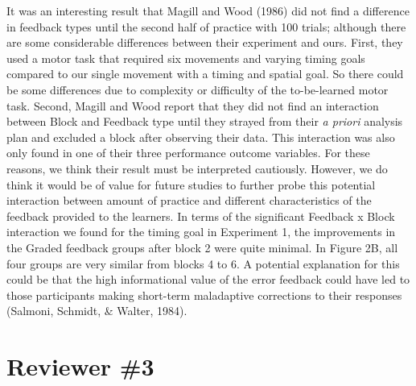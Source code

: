 \documentclass[final]{article}
\newcommand{\TaskEstimationBox}[2]{%
\ifoptiondraft{\parbox{1.0\linewidth}{\hfill \hfill {\colorbox{#2}{\color{White} \textbf{#1}}}}}%
{}%
}
\def\Done {\TaskEstimationBox{Done}{Blue}}
\begin{document}
It was an interesting result that Magill and Wood (1986) did not find a difference in feedback types until the second half of practice with 100 trials; although there are some considerable differences between their experiment and ours. First, they used a motor task that required six movements and varying timing goals compared to our single movement with a timing and spatial goal. So there could be some differences due to complexity or difficulty of the to-be-learned motor task. Second, Magill and Wood report that they did not find an interaction between Block and Feedback type until they strayed from their \emph{a priori} analysis plan and excluded a block after observing their data. This interaction was also only found in one of their three performance outcome variables. For these reasons, we think their result must be interpreted cautiously. However, we do think it would be of value for future studies to further probe this potential interaction between amount of practice and different characteristics of the feedback provided to the learners. In terms of the significant Feedback x Block interaction we found for the timing goal in Experiment 1, the improvements in the Graded feedback groups after block 2 were quite minimal. In Figure 2B, all four groups are very similar from blocks 4 to 6. A potential explanation for this could be that the high informational value of the error feedback could have led to those participants making short-term maladaptive corrections to their responses (Salmoni, Schmidt, \& Walter, 1984).

\Done

\hypertarget{reviewer-3}{%
\section{Reviewer \#3}\label{reviewer-3}}
\end{document}
